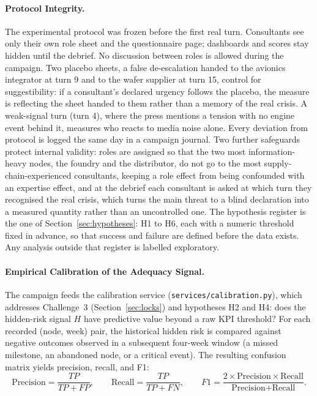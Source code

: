 \paragraph{Protocol Integrity.}
The experimental protocol was frozen before the first real turn. Consultants see only their own role sheet and the questionnaire page; dashboards and scores stay hidden until the debrief. No discussion between roles is allowed during the campaign. Two placebo sheets, a false de-escalation handed to the avionics integrator at turn 9 and to the wafer supplier at turn 15, control for suggestibility: if a consultant's declared urgency follows the placebo, the measure is reflecting the sheet handed to them rather than a memory of the real crisis. A weak-signal turn (turn 4), where the press mentions a tension with no engine event behind it, measures who reacts to media noise alone. Every deviation from protocol is logged the same day in a campaign journal. Two further safeguards protect internal validity: roles are assigned so that the two most information-heavy nodes, the foundry and the distributor, do not go to the most supply-chain-experienced consultants, keeping a role effect from being confounded with an expertise effect, and at the debrief each consultant is asked at which turn they recognised the real crisis, which turns the main threat to a blind declaration into a measured quantity rather than an uncontrolled one. The hypothesis register is the one of Section~\ref{sec:hypotheses}: H1 to H6, each with a numeric threshold fixed in advance, so that success and failure are defined before the data exists. Any analysis outside that register is labelled exploratory.

\paragraph{Empirical Calibration of the Adequacy Signal.}
The campaign feeds the calibration service (\texttt{services/calibration.py}), which addresses Challenge~3 (Section~\ref{sec:locks}) and hypotheses H2 and H4: does the hidden-risk signal $H$ have predictive value beyond a raw KPI threshold? For each recorded (node, week) pair, the historical hidden risk is compared against negative outcomes observed in a subsequent four-week window (a missed milestone, an abandoned node, or a critical event). The resulting confusion matrix yields precision, recall, and F1:
\begin{equation}
    \text{Precision} = \frac{TP}{TP+FP}, \qquad \text{Recall} = \frac{TP}{TP+FN}, \qquad F1 = \frac{2 \times \text{Precision}\times\text{Recall}}{\text{Precision}+\text{Recall}}.
    \label{eq:calib_metrics}
\end{equation}

